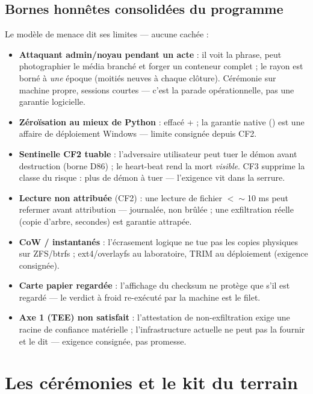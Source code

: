 \subsection{Bornes honnêtes consolidées du programme}\label{sec:bornes}

Le modèle de menace dit ses limites — aucune cachée :

\begin{itemize}
\item \textbf{Attaquant admin/noyau pendant un acte} : il voit la phrase, peut
photographier le média branché et forger un conteneur complet ; le rayon est borné à
\emph{une} époque (moitiés neuves à chaque clôture). Cérémonie sur machine propre,
sessions courtes — c'est la parade opérationnelle, pas une garantie logicielle.
\item \textbf{Zéroïsation au mieux de Python} :  effacé +  ;
la garantie native () est une affaire de déploiement Windows —
limite consignée depuis CF2.
\item \textbf{Sentinelle CF2 tuable} : l'adversaire utilisateur peut tuer le démon avant
destruction (borne D86) ; le heart-beat rend la mort \emph{visible}. CF3 supprime la
classe du risque : plus de démon à tuer — l'exigence vit dans la serrure.
\item \textbf{Lecture non attribuée} (CF2) : une lecture de fichier $< \sim$10 ms peut
refermer avant attribution — journalée, non brûlée ; une exfiltration réelle (copie
d'arbre, secondes) est garantie attrapée.
\item \textbf{CoW / instantanés} : l'écrasement logique ne tue pas les copies physiques
sur ZFS/btrfs ; ext4/overlayfs au laboratoire, TRIM au déploiement (exigence
consignée).
\item \textbf{Carte papier regardée} : l'affichage du checksum ne protège que s'il est
regardé — le verdict à froid re-exécuté par la machine est le filet.
\item \textbf{Axe 1 (TEE) non satisfait} : l'attestation de non-exfiltration exige une
racine de confiance matérielle ; l'infrastructure actuelle ne peut pas la fournir et le
dit — exigence consignée, pas promesse.
\end{itemize}

\section{Les cérémonies et le kit du terrain}\label{sec:ceremonies}

